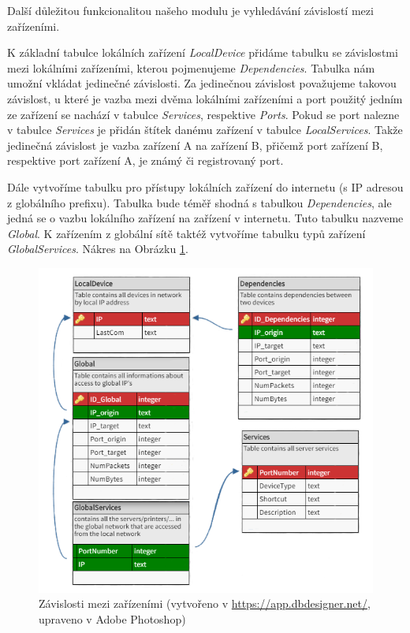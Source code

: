 \documentclass[thesis=B,czech,hidelinks]{FITthesis}[2019/03/21]
\begin{document}
        Další důležitou funkcionalitou našeho modulu je vyhledávání závislostí mezi zařízeními.
        
        K základní tabulce lokálních zařízení \emph{LocalDevice} přidáme tabulku se závislostmi mezi lokálními zařízeními, kterou pojmenujeme \emph{Dependencies}. Tabulka nám umožní vkládat jedinečné závislosti. Za jedinečnou závislost považujeme takovou závislost, u které je vazba mezi dvěma lokálními zařízeními a port použitý jedním ze zařízení se nachází v tabulce \emph{Services}, respektive \emph{Ports}. Pokud se port nalezne v tabulce \emph{Services} je přidán štítek danému zařízení v tabulce \emph{LocalServices}. Takže jedinečná závislost je vazba zařízení A na zařízení B, přičemž port zařízení B, respektive port zařízení A, je známý či registrovaný port.
        
        
        Dále vytvoříme tabulku pro přístupy lokálních zařízení do internetu (s IP adresou z globálního prefixu). Tabulka bude téměř shodná s tabulkou \emph{Dependencies}, ale jedná se o vazbu lokálního zařízení na zařízení v internetu. Tuto tabulku nazveme \emph{Global}. K zařízením z globální sítě taktéž vytvoříme tabulku typů zařízení \emph{GlobalServices}. Nákres na Obrázku \ref{DBDependencies}.
        \begin{figure}[h]
            \centering
            \includegraphics[width=\textwidth]{databaze_zavislosti.png}
            \caption[Závislosti mezi zařízeními]{Závislosti mezi zařízeními (vytvořeno v \url{https://app.dbdesigner.net/}, upraveno v Adobe Photoshop) }
            \label{DBDependencies}
        \end{figure}
        
\end{document}
